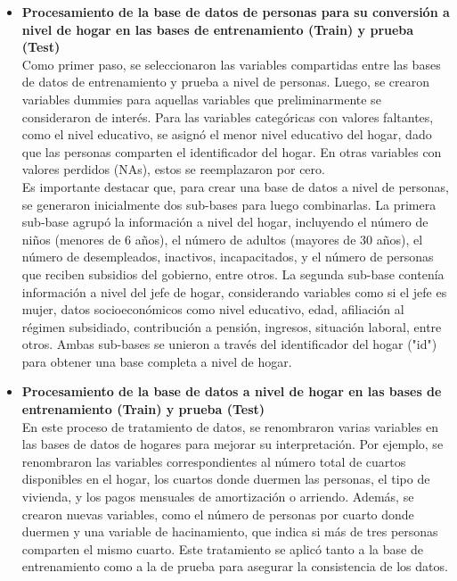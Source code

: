 \documentclass[a4paper]{article}
\theoremstyle{remark}
\theoremstyle{definition}
\begin{document}
\begin{itemize}
    \item \textbf{
Procesamiento de la base de datos de personas para su conversión a nivel de hogar en las bases de entrenamiento (Train) y prueba (Test)} \\


Como primer paso, se seleccionaron las variables compartidas entre las bases de datos de entrenamiento y prueba a nivel de personas. Luego, se crearon variables dummies para aquellas variables que preliminarmente se consideraron de interés. Para las variables categóricas con valores faltantes, como el nivel educativo, se asignó el menor nivel educativo del hogar, dado que las personas comparten el identificador del hogar. En otras variables con valores perdidos (NAs), estos se reemplazaron por cero.\\

Es importante destacar que, para crear una base de datos a nivel de personas, se generaron inicialmente dos sub-bases para luego combinarlas. La primera sub-base agrupó la información a nivel del hogar, incluyendo el número de niños (menores de 6 años), el número de adultos (mayores de 30 años), el número de desempleados, inactivos, incapacitados, y el número de personas que reciben subsidios del gobierno, entre otros. La segunda sub-base contenía información a nivel del jefe de hogar, considerando variables como si el jefe es mujer, datos socioeconómicos como nivel educativo, edad, afiliación al régimen subsidiado, contribución a pensión, ingresos, situación laboral, entre otros. Ambas sub-bases se unieron a través del identificador del hogar ("id") para obtener una base completa a nivel de hogar.\\



    \item \textbf{Procesamiento de la base de datos a nivel de hogar en las bases de entrenamiento (Train) y prueba (Test)} \\

En este proceso de tratamiento de datos, se renombraron varias variables en las bases de datos de hogares para mejorar su interpretación. Por ejemplo, se renombraron las variables correspondientes al número total de cuartos disponibles en el hogar, los cuartos donde duermen las personas, el tipo de vivienda, y los pagos mensuales de amortización o arriendo. Además, se crearon nuevas variables, como el número de personas por cuarto donde duermen y una variable de hacinamiento, que indica si más de tres personas comparten el mismo cuarto. Este tratamiento se aplicó tanto a la base de entrenamiento como a la de prueba para asegurar la consistencia de los datos. \\


\end{itemize}
\end{document}
